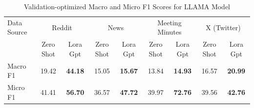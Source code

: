 \begin{table}[htbp]
\centering
\begin{tabular}{l *{8}{c}}
\toprule
Data Source & \multicolumn{2}{c}{Reddit} & \multicolumn{2}{c}{News} & \multicolumn{2}{c}{Meeting Minutes} & \multicolumn{2}{c}{X (Twitter)} \\
& Zero Shot & Lora Gpt & Zero Shot & Lora Gpt & Zero Shot & Lora Gpt & Zero Shot & Lora Gpt \\
\midrule
Macro F1 & 19.42 & \textbf{44.18} & 15.05 & \textbf{15.67} & 13.84 & \textbf{14.93} & 16.57 & \textbf{20.99} \\
Micro F1 & 41.41 & \textbf{56.70} & 36.57 & \textbf{47.72} & 39.97 & \textbf{72.76} & 39.56 & \textbf{42.76} \\
\bottomrule
\end{tabular}
\centering\caption{Validation-optimized Macro and Micro F1 Scores for LLAMA Model}
\label{tab:llama_macro_micro}
\end{table}